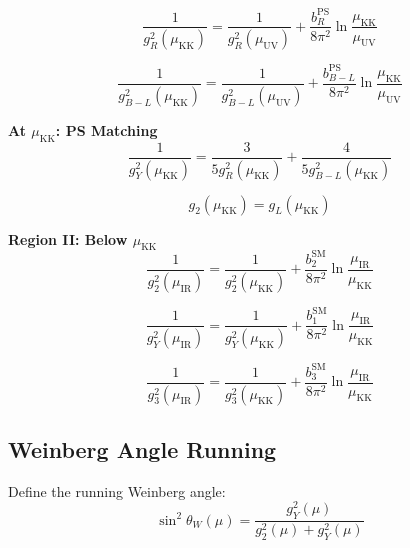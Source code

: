 \documentclass[11pt,a4paper]{article}
\begin{document}
\begin{equation}
\label{eq:region-I-gR}
\frac{1}{g_R^2(\mu_{\text{KK}})} = \frac{1}{g_R^2(\mu_{\text{UV}})} + \frac{b_R^{\text{PS}}}{8\pi^2}\ln\frac{\mu_{\text{KK}}}{\mu_{\text{UV}}}
\end{equation}

\begin{equation}
\label{eq:region-I-gBL}
\frac{1}{g_{B-L}^2(\mu_{\text{KK}})} = \frac{1}{g_{B-L}^2(\mu_{\text{UV}})} + \frac{b_{B-L}^{\text{PS}}}{8\pi^2}\ln\frac{\mu_{\text{KK}}}{\mu_{\text{UV}}}
\end{equation}

\textbf{At $\mu_{\text{KK}}$: PS Matching}
\begin{equation}
\label{eq:ps-match-full}
\frac{1}{g_Y^2(\mu_{\text{KK}})} = \frac{3}{5g_R^2(\mu_{\text{KK}})} + \frac{4}{5g_{B-L}^2(\mu_{\text{KK}})}
\end{equation}

\begin{equation}
\label{eq:g2-match}
g_2(\mu_{\text{KK}}) = g_L(\mu_{\text{KK}})
\end{equation}

\textbf{Region II: Below $\mu_{\text{KK}}$}
\begin{equation}
\label{eq:region-II-g2}
\frac{1}{g_2^2(\mu_{\text{IR}})} = \frac{1}{g_2^2(\mu_{\text{KK}})} + \frac{b_2^{\text{SM}}}{8\pi^2}\ln\frac{\mu_{\text{IR}}}{\mu_{\text{KK}}}
\end{equation}

\begin{equation}
\label{eq:region-II-gY}
\frac{1}{g_Y^2(\mu_{\text{IR}})} = \frac{1}{g_Y^2(\mu_{\text{KK}})} + \frac{b_1^{\text{SM}}}{8\pi^2}\ln\frac{\mu_{\text{IR}}}{\mu_{\text{KK}}}
\end{equation}

\begin{equation}
\label{eq:region-II-g3}
\frac{1}{g_3^2(\mu_{\text{IR}})} = \frac{1}{g_3^2(\mu_{\text{KK}})} + \frac{b_3^{\text{SM}}}{8\pi^2}\ln\frac{\mu_{\text{IR}}}{\mu_{\text{KK}}}
\end{equation}

\subsection{Weinberg Angle Running}
\label{subsec:weinberg-running}

Define the running Weinberg angle:
\begin{equation}
\label{eq:sin2-def-running}
\sin^2\theta_W(\mu) = \frac{g_Y^2(\mu)}{g_2^2(\mu) + g_Y^2(\mu)}
\end{equation}
\end{document}
